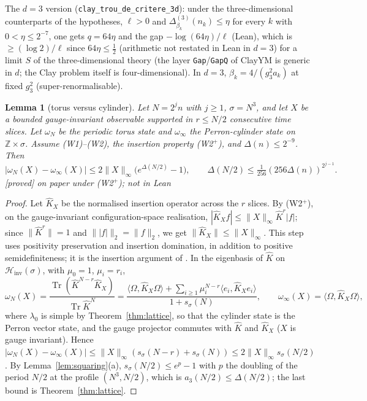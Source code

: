 \documentclass[11pt,a4paper]{article}
\theoremstyle{plain}
\newtheorem{lemma}[theorem]{Lemma}
\theoremstyle{definition}
\theoremstyle{remark}
\numberwithin{equation}{section}
\newcommand{\Z}{\mathbb{Z}}
\newcommand{\Tr}{\operatorname{Tr}}
\newcommand{\Hinv}{\mathcal{H}_{\mathrm{inv}}}
\newcommand{\Kh}{\widehat K}
\newcommand{\st}[1]{\textsf{[#1]}}
\begin{document}
The $d=3$ version (\texttt{clay\_trou\_de\_critere\_3d}): under the three-dimensional counterparts of the hypotheses, $\ell>0$ and $\Delta^{(3)}_{\beta_k}(n_k)\le\eta$ for every $k$ with $0<\eta\le2^{-7}$, one gets $q=64\eta$ and the
gap $-\log(64\eta)/\ell$ (Lean), which is $\ge(\log2)/\ell$ since $64\eta\le\frac12$ (arithmetic not restated in Lean in $d=3$) for a limit $S$ of the three-dimensional theory (the layer \texttt{Gap}/\texttt{GapQ} of ClayYM is
generic in $d$; the Clay problem itself is four-dimensional). In $d=3$, $\beta_k=4/(g_3^2a_k)$ at fixed $g_3^2$ (super-renormalisable).

\begin{lemma}[torus versus cylinder]\label{lem:torus}
Let $N=2^jn$ with $j\ge1$, $\sigma=N^3$, and let $X$ be a bounded gauge-invariant observable supported in $r\le N/2$ consecutive time
slices. Let $\omega_N$ be the periodic torus state and $\omega_\infty$ the Perron-cylinder state on $\Z\times\sigma$. Assume (W1)--(W2),
the insertion property (W2$^+$), and $\Delta(n)\le2^{-9}$. Then
\[
|\omega_N(X)-\omega_\infty(X)|\le2\|X\|_\infty\bigl(e^{\Delta(N/2)}-1\bigr),\qquad \Delta(N/2)\le\tfrac1{256}(256\Delta(n))^{2^{j-1}}.
\]
\st{proved} on paper under (W2$^+$); not in Lean
\end{lemma}
\begin{proof}
Let $\Kh_X$ be the normalised insertion operator across the $r$ slices. By (W2$^+$), on the gauge-invariant configuration-space realisation,
$|\Kh_Xf|\le\|X\|_\infty\Kh^r|f|$; since $\|\Kh^r\|=1$ and $\||f|\|_2=\|f\|_2$, we get $\|\Kh_X\|\le\|X\|_\infty$. This step uses positivity
preservation and insertion domination, in addition to positive semidefiniteness; it is the insertion argument of \cite[proof of Prop.~2.2]{OAI26}.
In the eigenbasis of $\Kh$ on $\Hinv(\sigma)$, with $\mu_0=1$, $\mu_i=r_i$,
\[
\omega_N(X)=\frac{\Tr(\Kh^{N-r}\Kh_X)}{\Tr\Kh^N}=\frac{\langle\Omega,\Kh_X\Omega\rangle+\sum_{i\ge1}\mu_i^{N-r}\langle e_i,\Kh_Xe_i\rangle}{1+s_\sigma(N)},
\qquad\omega_\infty(X)=\langle\Omega,\Kh_X\Omega\rangle,
\]
where $\lambda_0$ is simple by Theorem~\ref{thm:lattice}, so that the cylinder state is the Perron vector state, and the gauge
projector commutes with $\Kh$ and $\Kh_X$ ($X$ is gauge invariant). Hence
$|\omega_N(X)-\omega_\infty(X)|\le\|X\|_\infty(s_\sigma(N-r)+s_\sigma(N))\le2\|X\|_\infty s_\sigma(N/2)$. By Lemma~\ref{lem:squaring}(a),
$s_\sigma(N/2)\le e^{p}-1$ with $p$ the doubling of the period $N/2$ at the profile $(N^3,N/2)$, which is $a_3(N/2)\le\Delta(N/2)$; the
last bound is Theorem~\ref{thm:lattice}.
\end{proof}
\end{document}
